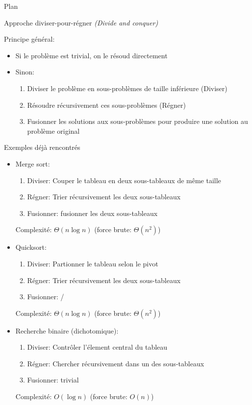 \begin{frame}{Plan}


\end{frame}

\begin{frame}{Approche diviser-pour-régner {\it (Divide and conquer)}}

Principe général:
\begin{itemize}
\item Si le problème est trivial, on le résoud directement
\item Sinon:
\begin{enumerate}
\item Diviser le problème en sous-problèmes de taille inférieure (Diviser)
\item Résoudre récursivement ces sous-problèmes (Régner)
\item Fusionner les solutions aux sous-problèmes pour produire une solution au problème original
\end{enumerate}
\end{itemize}

\end{frame}

\begin{frame}{Exemples déjà rencontrés}

\begin{itemize}
\item \alert{Merge sort:}
\begin{enumerate}
\item Diviser: Couper le tableau en deux sous-tableaux de même taille
\item Régner: Trier récursivement les deux sous-tableaux
\item Fusionner: fusionner les deux sous-tableaux
\end{enumerate}
Complexité: $\Theta(n\log n)$ (force brute: $\Theta(n^2)$)
\item \alert{Quicksort:}
\begin{enumerate}
\item Diviser: Partionner le tableau selon le pivot
\item Régner: Trier récursivement les deux sous-tableaux
\item Fusionner: /
\end{enumerate}
Complexité: $\Theta(n\log n)$ (force brute: $\Theta(n^2)$)
\item \alert{Recherche binaire} (dichotomique):
\begin{enumerate}
\item Diviser: Contrôler l'élement central du tableau
\item Régner: Chercher récursivement dans un des sous-tableaux
\item Fusionner: trivial
\end{enumerate}
Complexité: $O(\log n)$ (force brute: $O(n)$)
\end{itemize}

\end{frame}

